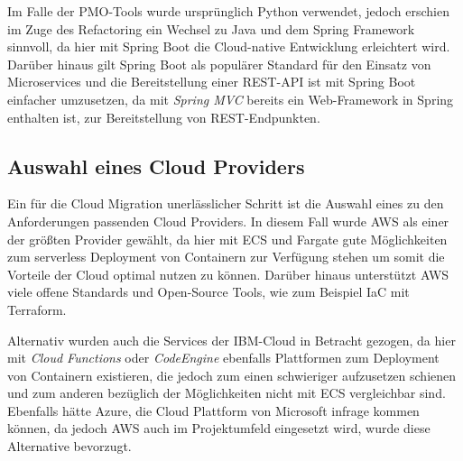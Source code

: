 Im Falle der PMO-Tools wurde ursprünglich Python verwendet, jedoch erschien im Zuge des Refactoring ein Wechsel zu Java und dem \gls{Spring} Framework sinnvoll, da hier mit \gls{Spring Boot} die Cloud-native Entwicklung erleichtert wird. Darüber hinaus gilt \gls{Spring Boot} als populärer Standard für den Einsatz von Microservices und die Bereitstellung einer \ac{REST}-\ac{API} ist mit \gls{Spring Boot} einfacher umzusetzen, da mit \textit{Spring MVC} bereits ein Web-Framework in \gls{Spring} enthalten ist, zur Bereitstellung von \ac{REST}-Endpunkten.

\subsection{Auswahl eines Cloud Providers}
Ein für die Cloud Migration unerlässlicher Schritt ist die Auswahl eines zu den Anforderungen passenden Cloud Providers. In diesem Fall wurde \ac{AWS} als einer der größten Provider \cite[Vgl.][S. 6]{Sustar2022} gewählt, da hier mit \ac{ECS} und \gls{Fargate} gute Möglichkeiten zum serverless Deployment von Containern zur Verfügung stehen um somit die Vorteile der Cloud optimal nutzen zu können. Darüber hinaus unterstützt \ac{AWS} viele offene Standards und Open-Source Tools, wie zum Beispiel \ac{IaC} mit Terraform.

Alternativ wurden auch die Services der IBM-Cloud in Betracht gezogen, da hier mit \textit{Cloud Functions} oder \textit{CodeEngine} ebenfalls Plattformen zum Deployment von Containern existieren, die jedoch zum einen schwieriger aufzusetzen schienen und zum anderen bezüglich der Möglichkeiten nicht mit \ac{ECS} vergleichbar sind. Ebenfalls hätte Azure, die Cloud Plattform von Microsoft infrage kommen können, da jedoch \ac{AWS} auch im Projektumfeld eingesetzt wird, wurde diese Alternative bevorzugt. \pagebreak